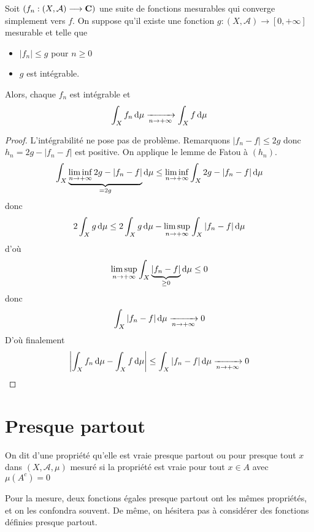 \begin{thm}
    Soit $(f_n:(X, \mathcal  A)\longrightarrow \mathbf C)$ une suite de fonctions mesurables qui converge simplement vers $f$. On suppose qu'il existe une fonction  $g:(X, \mathcal  A)\longrightarrow [0, +\infty]$ mesurable et telle que \begin{itemize}
        \item $|f_n|\leq g$ pour $n\geq 0$
        \item $g$ est intégrable.
    \end{itemize}
    Alors, chaque $f_n$ est intégrable et \[\int_Xf_n\mathop{}\!\mathrm d\mu \xrightarrow[n\to+\infty]{}\int_Xf\mathop{}\!\mathrm d\mu\]
\end{thm}

\begin{proof}
    L'intégrabilité ne pose pas de problème. Remarquons  $|f_n-f|\leq 2g$ donc $h_n=2g-|f_n-f|$ est positive. On applique le lemme de Fatou à  $(h_n)$. \[
        \int_X\underbrace{\liminf_{n\to +\infty}2g-|f_n-f|}_{=2g}\mathop{}\!\mathrm d\mu\leq \liminf_{n\to +\infty}\int_X2g-|f_n-f|\mathop{}\!\mathrm d\mu
    \]
    donc \[
        2\int_Xg\mathop{}\!\mathrm d\mu\leq 2\int_Xg\mathop{}\!\mathrm d\mu -\limsup_{n\to +\infty}\int_X |f_n-f|\mathop{}\!\mathrm d\mu
    \] 
    d'où \[
        \limsup_{n\to +\infty} \int_X\underbrace{|f_n-f|}_{\geq 0}\mathop{}\!\mathrm d\mu \leq 0
    \] 
    donc \[\int_X|f_n-f|\mathop{}\!\mathrm d\mu \xrightarrow[n\to+\infty]{}0\]
    D'où finalement \[
        \left| \int_Xf_n\mathop{}\!\mathrm d\mu-\int_Xf\mathop{}\!\mathrm d\mu \right|\leq \int_X |f_n-f|\mathop{}\!\mathrm d\mu \xrightarrow[n\to+\infty]{}0
    \] 
\end{proof}

\section{Presque partout}

\begin{dfn}
    On dit d'une propriété qu'elle est vraie presque partout ou pour presque tout $x$ dans  $(X, \mathcal  A, \mu)$ mesuré si la propriété est vraie pour tout $x \in  A$ avec $\mu(A^c)=0$
\end{dfn}

\begin{rem}
Pour la mesure, deux fonctions égales presque partout ont les mêmes propriétés, et on les confondra souvent. De même, on hésitera pas à considérer des fonctions définies presque partout.
\end{rem}

